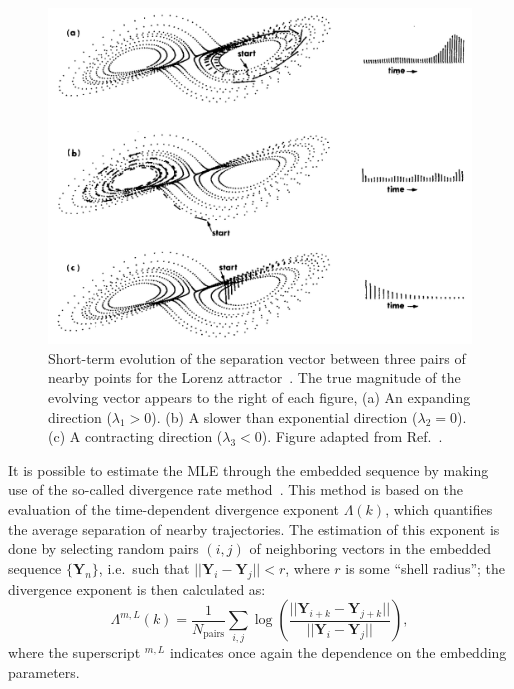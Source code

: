 \begin{figure}[!htbp]
\centering
\includegraphics[width=\linewidth]{images/lorenz_lyapunov.png}   
\caption{
    Short-term evolution of the separation vector between three pairs of
    nearby points for the Lorenz attractor~\cite{lorenz1963deterministic}.
    The true magnitude of the evolving
    vector appears to the right of each figure, (a) An expanding direction ($\lambda_1>0$). (b)
    A slower than exponential direction ($\lambda_2=0$). (c) A contracting direction ($\lambda_3<0$).
    Figure adapted from Ref.~\cite{wolf1986quantifying}.
}\label{fig: lorenz lyapunov}
\end{figure}

It is possible to estimate the MLE through the embedded sequence by making use of the so-called
divergence rate method~\cite{ref:gao1993local}. This method
is based on the evaluation of the time-dependent divergence exponent $\Lambda(k)$,
which quantifies the average separation of nearby trajectories.
The estimation of this exponent is done by selecting random pairs $(i,j)$ of neighboring vectors
in the embedded sequence $\{\mathbf{Y}_n\}$, i.e.\ such that $||\mathbf{Y}_i-\mathbf{Y}_j||<r$,
where $r$ is some ``shell radius''; the divergence exponent is then calculated as:
\begin{equation}
    \label{eq: divergence exponent}
    \Lambda^{m,L}(k)=\frac{1}{N_{\text{pairs}}}\sum_{i,j}\log\left(
        \frac{||\mathbf{Y}_{i+k}-\mathbf{Y}_{j+k}||}{||\mathbf{Y}_i-\mathbf{Y}_j||}
    \right),
\end{equation}
where the superscript $^{m,L}$ indicates once again the dependence on the embedding parameters.

